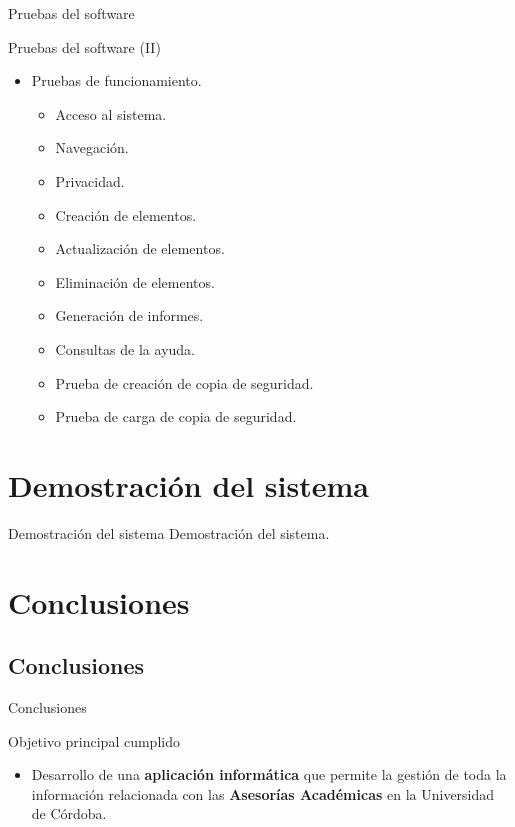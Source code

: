 \documentclass[10pt, hyperref={pdfpagelabels=false}]{beamer}
\begin{document}
    \begin{frame}{Pruebas del software}
      \begin{block}{Pruebas del software (II)}
        \begin{itemize}
          \item Pruebas de funcionamiento.
          \begin{itemize}
            \item Acceso al sistema.
            \item Navegación.
            \item Privacidad.
            \item Creación de elementos.
            \item Actualización de elementos.
            \item Eliminación de elementos.
            \item Generación de informes.
            \item Consultas de la ayuda.
            \item Prueba de creación de copia de seguridad.
            \item Prueba de carga de copia de seguridad.
          \end{itemize}
          \end{itemize}
        \end{block}
    \end{frame}


  \section{Demostración del sistema}
    \begin{frame}{Demostración del sistema}
      Demostración del sistema.
    \end{frame}


  \section{Conclusiones}
    \subsection{Conclusiones}
      \begin{frame}{Conclusiones}
        \begin{block}{Objetivo principal cumplido}
          \begin{itemize}
            \item Desarrollo de una \textbf{aplicación informática} que permite
            la gestión de toda la información relacionada con las
            \textbf{Asesorías Académicas} en la Universidad de Córdoba.
          \end{itemize}
        \end{block}
      \end{frame}
\end{document}
